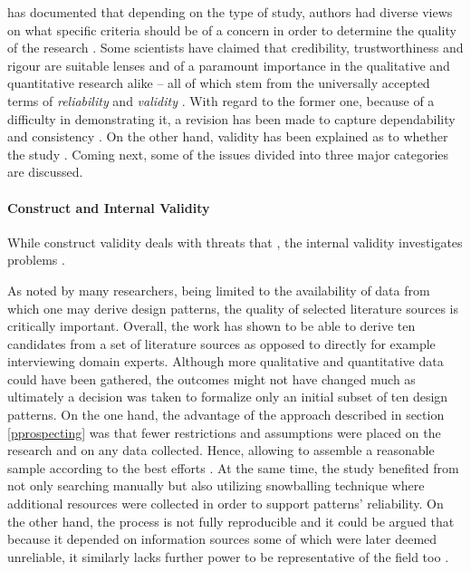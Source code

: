 \textcite{Golafshani2003} has documented that depending on the type of study, authors had diverse views on what specific criteria should be of a concern in order to determine the quality of the research \parencite{Long2000RigourResearch}.
Some scientists have claimed that credibility, trustworthiness and rigour are suitable lenses and of a paramount importance in the qualitative and quantitative research alike -- all of which stem from the universally accepted terms of \emph{reliability} and \emph{validity} \parencites{Golafshani2003}{Long2000RigourResearch}. 
With regard to the former one, because of a difficulty in demonstrating it, a revision has been made to capture dependability and consistency \parencite{Golafshani2003}.
On the other hand, validity has been explained as to whether the study  \parencite[31]{Long2000RigourResearch}.
Coming next, some of the issues divided into three major categories are discussed.

\paragraph*{Construct and Internal Validity}
While construct validity deals with threats that , the internal validity investigates problems  \parencite[13]{GoFDesignPatternsAmpatzoglou2013}. 

As noted by many researchers, being limited to the availability of data from which one may derive design patterns, the quality of selected literature sources is critically important. 
Overall, the work has shown to be able to derive ten candidates from a set of literature sources as opposed to directly for example interviewing domain experts.
Although more qualitative and quantitative data could have been gathered, the outcomes might not have changed much as ultimately a decision was taken to formalize only an initial subset of ten design patterns. 
On the one hand, the advantage of the approach described in section \ref{pprospecting} was that fewer restrictions and assumptions were placed on the research and on any data collected. 
Hence, allowing to assemble a reasonable sample according to the best efforts \parencites{Krishnakumar2011}{JAN:JAN623}.
At the same time, the study benefited from not only searching manually but also utilizing snowballing technique where additional resources were collected in order to support patterns' reliability.
On the other hand, the process is not fully reproducible and it could be argued that because it depended on information sources some of which were later deemed unreliable, it similarly lacks further power to be representative of the field too \parencite{Hajimia2014}.

